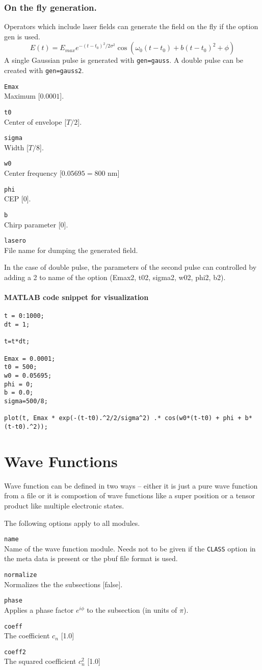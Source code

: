 \documentclass[a4paper,12pt]{scrbook}
\newcommand{\option}[2]{\item \texttt{#1}\\ #2}
\newcommand{\code}[1]{\texttt{#1}}
\begin{document}
\subsection{On the fly generation.}
Operators which include laser fields can generate the field on the fly if the option gen is used.
\begin{equation}
E(t) = E_{max} e^{-(t-t_0)^2/2\sigma^2} \cos(\omega_0 (t-t_0)+ b(t-t_0)^2+\phi) 
\end{equation}
A single Gaussian pulse is generated with \verb|gen=gauss|. A double pulse can be created with
\verb|gen=gauss2|.
\begin{options}
 \option{Emax}{Maximum [$0.0001$].}
 \option{t0}{Center of envelope [$T/2$].}
 \option{sigma}{Width [$T/8$].}
 \option{w0}{Center frequency [$0.05695 = 800$ nm]}
 \option{phi}{CEP [0].}
 \option{b}{Chirp parameter [0].}
 \option{lasero}{File name for dumping the generated field.}
\end{options}
In the case of double pulse, the parameters of the second pulse can controlled by adding a 2 to
name of the option (Emax2, t02, sigma2, w02, phi2, b2).

\subsubsection*{MATLAB code snippet for visualization}
\begin{verbatim}
t = 0:1000;
dt = 1;

t=t*dt;

Emax = 0.0001;
t0 = 500;
w0 = 0.05695;
phi = 0;
b = 0.0;
sigma=500/8;

plot(t, Emax * exp(-(t-t0).^2/2/sigma^2) .* cos(w0*(t-t0) + phi + b*(t-t0).^2)); 
\end{verbatim}


\chapter{Wave Functions}
Wave function can be defined in two ways -- either it is just a pure wave function from a
file or it is compostion of wave functions like a super position or a tensor product like
multiple electronic states.

The following options apply to all modules.
\begin{options}
 \option{name}{Name of the wave function module. Needs not to be given if the \code{CLASS} option in the meta data is present or the pbuf file format is used.}
 \option{normalize}{Normalizes the the subsections [false].}
 \option{phase}{Applies a phase factor $e^{i\phi}$ to the subsection (in units of $\pi$).}
 \option{coeff}{The coefficient $c_n$ [1.0]}
 \option{coeff2}{The squared coefficient $c^2_n$ [1.0]}
\end{options}
\end{document}
